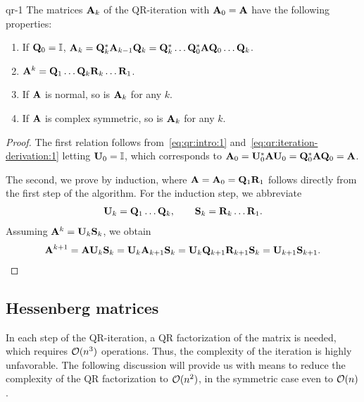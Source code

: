 \begin{Lemma}{qr-1}
  The matrices $\mathbf A_k$ of the QR-iteration with $\mathbf A_0 = \mathbf A$
  have the following properties:
  \begin{enumerate}
  \item If $\mathbf Q_0=\mathbb I$, $\mathbf A_{k} = \mathbf Q_k^*\mathbf A_{k-1}\mathbf Q_k = \mathbf Q_k^*\dots\mathbf Q_0^*\mathbf A\mathbf Q_0\dots\mathbf Q_k$.
  \item $\mathbf A^k=\mathbf Q_1\dots\mathbf Q_k\mathbf R_k\dots\mathbf R_1$.
  \item If $\mathbf A$ is normal, so is $\mathbf A_k$ for any $k$.
  \item If $\mathbf A$ is complex symmetric, so is $\mathbf A_k$ for any $k$.
  \end{enumerate}
\end{Lemma}

\begin{proof}
  The first relation follows from~\eqref{eq:qr:intro:1}
  and~\eqref{eq:qr:iteration-derivation:1} letting $\mathbf U_0=\mathbb I$,
  which corresponds to $\mathbf A_0 = \mathbf U_0^*\mathbf A\mathbf U_0 = \mathbf Q_0^*\mathbf A\mathbf Q_0 = \mathbf A$.
  
  The second, we prove by induction, where
  $\mathbf A = \mathbf A_0 = \mathbf Q_1\mathbf R_1$ follows directly from the first
  step of the algorithm. For the induction step, we abbreviate
  \begin{gather}
    \mathbf U_k = \mathbf Q_1\dots\mathbf Q_k,\qquad \mathbf S_k = \mathbf R_k\dots\mathbf R_1.
  \end{gather}
  Assuming $\mathbf A^k = \mathbf U_k\mathbf S_k$, we obtain
  \begin{gather}
    \mathbf A^{k+1} = \mathbf A\mathbf U_k\mathbf S_k = \mathbf U_k\mathbf A_{k+1}\mathbf S_k
    = \mathbf U_k\mathbf Q_{k+1}\mathbf R_{k+1}\mathbf S_k = \mathbf U_{k+1}\mathbf S_{k+1}.
  \end{gather}
\end{proof}

\subsection{Hessenberg matrices}
\begin{intro}
  In each step of the QR-iteration, a QR factorization of the matrix
  is needed, which requires $\mathcal O(n^3)$ operations. Thus, the
  complexity of the iteration is highly unfavorable. The following
  discussion will provide us with means to reduce the complexity of
  the QR factorization to $\mathcal O(n^2)$, in the symmetric case even to
  $\mathcal O(n)$.
\end{intro}

